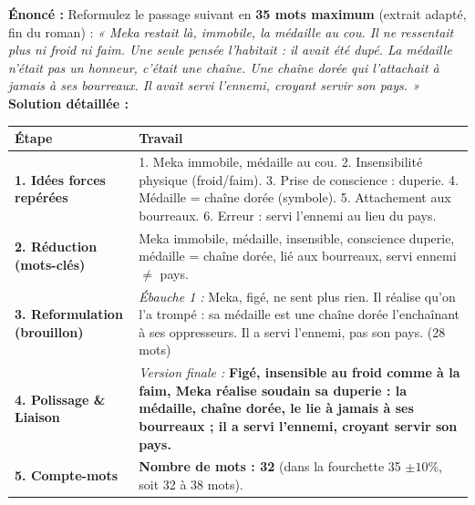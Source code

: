 \documentclass[11pt]{article}
\begin{document}
\begin{exoresolu}
\textbf{Énoncé :} Reformulez le passage suivant en \textbf{35 mots maximum} (extrait adapté, fin du roman) :
\textit{« Meka restait là, immobile, la médaille au cou. Il ne ressentait plus ni froid ni faim. Une seule pensée l'habitait : il avait été dupé. La médaille n'était pas un honneur, c'était une chaîne. Une chaîne dorée qui l'attachait à jamais à ses bourreaux. Il avait servi l'ennemi, croyant servir son pays. »}
\tcblower
\textbf{Solution détaillée :}

\begin{tabularx}{\linewidth}{|l|X|}
\hline
\rowcolor{popblueL}
\textbf{Étape} & \textbf{Travail} \\
\hline
\textbf{1. Idées forces repérées} & 1. Meka immobile, médaille au cou. 2. Insensibilité physique (froid/faim). 3. Prise de conscience : duperie. 4. Médaille = chaîne dorée (symbole). 5. Attachement aux bourreaux. 6. Erreur : servi l'ennemi au lieu du pays. \\
\hline
\textbf{2. Réduction (mots-clés)} & Meka immobile, médaille, insensible, conscience duperie, médaille = chaîne dorée, lié aux bourreaux, servi ennemi $\neq$ pays. \\
\hline
\textbf{3. Reformulation (brouillon)} & \textit{Ébauche 1 :} Meka, figé, ne sent plus rien. Il réalise qu'on l'a trompé : sa médaille est une chaîne dorée l'enchaînant à ses oppresseurs. Il a servi l'ennemi, pas son pays. (28 mots) \\
\hline
\textbf{4. Polissage \& Liaison} & \textit{Version finale :} \textbf{Figé, insensible au froid comme à la faim, Meka réalise soudain sa duperie : la médaille, chaîne dorée, le lie à jamais à ses bourreaux ; il a servi l'ennemi, croyant servir son pays.} \\
\hline
\textbf{5. Compte-mots} & \textbf{Nombre de mots : 32} (dans la fourchette 35 $\pm 10\%$, soit 32 à 38 mots). \\
\hline
\end{tabularx}


\end{exoresolu}
\end{document}
